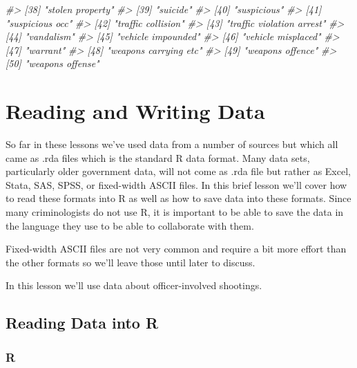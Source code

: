 \documentclass[
  12pt,
]{book}
\newenvironment{Shaded}{\begin{snugshade}}{\end{snugshade}}
\newcommand{\CommentTok}[1]{\textcolor[rgb]{0.37,0.37,0.37}{\textit{#1}}}
\begin{document}
\begin{Shaded}
\begin{Highlighting}[]
\CommentTok{\#> [38] "stolen property"                           }
\CommentTok{\#> [39] "suicide"                                   }
\CommentTok{\#> [40] "suspicious"                                }
\CommentTok{\#> [41] "suspicious occ"                            }
\CommentTok{\#> [42] "traffic collision"                         }
\CommentTok{\#> [43] "traffic violation arrest"                  }
\CommentTok{\#> [44] "vandalism"                                 }
\CommentTok{\#> [45] "vehicle impounded"                         }
\CommentTok{\#> [46] "vehicle misplaced"                         }
\CommentTok{\#> [47] "warrant"                                   }
\CommentTok{\#> [48] "weapons carrying etc"                      }
\CommentTok{\#> [49] "weapons offence"                           }
\CommentTok{\#> [50] "weapons offense"}
\end{Highlighting}
\end{Shaded}

\hypertarget{reading-and-writing-data}{%
\chapter{Reading and Writing Data}\label{reading-and-writing-data}}

So far in these lessons we've used data from a number of sources but which all came as .rda files which is the standard R data format. Many data sets, particularly older government data, will not come as .rda file but rather as Excel, Stata, SAS, SPSS, or fixed-width ASCII files. In this brief lesson we'll cover how to read these formats into R as well as how to save data into these formats. Since many criminologists do not use R, it is important to be able to save the data in the language they use to be able to collaborate with them.

Fixed-width ASCII files are not very common and require a bit more effort than the other formats so we'll leave those until later to discuss.

In this lesson we'll use data about officer-involved shootings.

\hypertarget{reading-data-into-r}{%
\section{Reading Data into R}\label{reading-data-into-r}}

\hypertarget{r}{%
\subsection{R}\label{r}}
\end{document}
